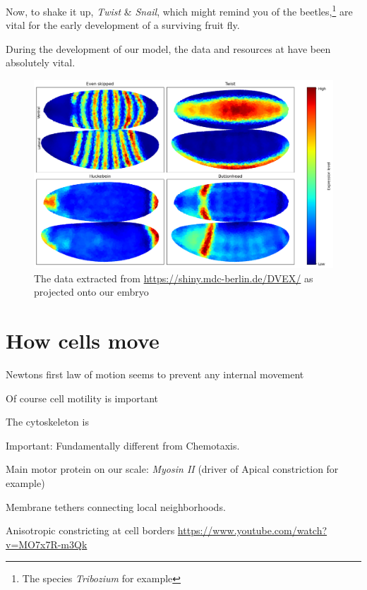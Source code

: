 \noindent
Now, to shake it up, \textit{Twist} \& \textit{Snail}, which might remind you of the beetles,\footnote{The species \textit{Tribozium} for example\cite{sommer1994expression}} are vital for the early development of a surviving fruit fly.


During the development of our model, the data and resources at have been absolutely vital. 

\begin{figure}[H]
    \centering
    \includegraphics[width=1.2\linewidth]{chapters/Theory/figures/patterning.png}
    \caption{The data extracted from \url{https://shiny.mdc-berlin.de/DVEX/} as projected onto our embryo}
    \label{fig:enter-label}
\end{figure}



\section{How cells move}
Newtons first law of motion seems to prevent any internal movement

Of course cell motility is important 

The cytoskeleton is 

Important: Fundamentally different from Chemotaxis. 

Main motor protein on our scale:  \textit{Myosin II} (driver of Apical constriction for example) 

Membrane tethers connecting local neighborhoods.

Anisotropic constricting at cell borders \url{https://www.youtube.com/watch?v=MO7x7R-m3Qk}


